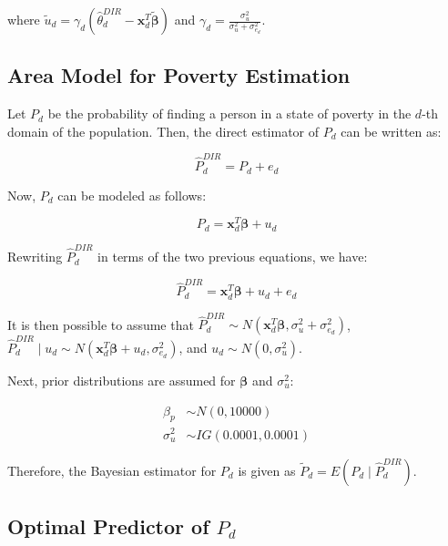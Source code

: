 \documentclass[
  12pt,
]{book}
\begin{document}
where \(\tilde{u}_d = \gamma_d\left(\hat{\theta}^{DIR}_{d} - \boldsymbol{x}^{T}_{d}\tilde{\boldsymbol{\beta}} \right)\) and \(\gamma_d=\frac{\sigma^2_u}{\sigma^2_u + \sigma^2_{e_d}}\).

\hypertarget{area-model-for-poverty-estimation}{%
\subsection*{Area Model for Poverty Estimation}\label{area-model-for-poverty-estimation}}

Let \(P_d\) be the probability of finding a person in a state of poverty in the \(d\)-th domain of the population. Then, the direct estimator of \(P_d\) can be written as:

\[
\hat{P}^{DIR}_{d} = P_d + e_d
\]

Now, \(P_d\) can be modeled as follows:

\[
P_d = \boldsymbol{x}^{T}_{d}\boldsymbol{\beta} + u_d
\]

Rewriting \(\hat{P}^{DIR}_{d}\) in terms of the two previous equations, we have:

\[
\hat{P}^{DIR}_{d} = \boldsymbol{x}^{T}_{d}\boldsymbol{\beta} + u_d + e_d
\]

It is then possible to assume that \(\hat{P}^{DIR}_d \sim N(\boldsymbol{x}^{T}_{d}\boldsymbol \beta, \sigma_u^2 +\sigma_{e_d}^2)\), \(\hat{P}^{DIR}_d \mid u_d \sim N(\boldsymbol{x}^{T}_{d}\boldsymbol \beta + u_d,\sigma_{e_d}^2)\), and \(u_d \sim N(0, \sigma^2_u)\).

Next, prior distributions are assumed for \(\boldsymbol{\beta}\) and \(\sigma^2_u\):

\begin{align*}
\beta_p & \sim N(0, 10000)\\
\sigma^2_u &\sim IG(0.0001, 0.0001)
\end{align*}

Therefore, the Bayesian estimator for \(P_d\) is given as \(\tilde{P}_d = E\left(P_d\mid\hat{P}_d^{DIR}\right)\).

\hypertarget{optimal-predictor-of-p_d}{%
\subsection*{\texorpdfstring{Optimal Predictor of \(P_d\)}{Optimal Predictor of P\_d}}\label{optimal-predictor-of-p_d}}
\end{document}
